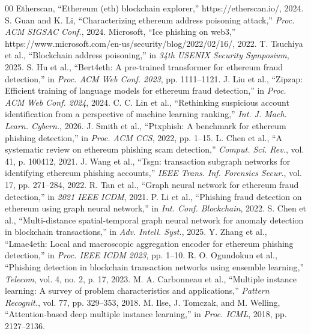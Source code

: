 \documentclass[conference]{IEEEtran}
\begin{document}
\begin{thebibliography}{00}
 Etherscan, ``Ethereum (eth) blockchain explorer,'' https://etherscan.io/, 2024.
 S. Guan and K. Li, ``Characterizing ethereum address poisoning attack,'' \emph{Proc. ACM SIGSAC Conf.}, 2024.
 Microsoft, ``Ice phishing on web3,'' https://www.microsoft.com/en-us/security/blog/2022/02/16/, 2022.
 T. Tsuchiya et al., ``Blockchain address poisoning,'' in \emph{34th USENIX Security Symposium}, 2025.
 S. Hu et al., ``Bert4eth: A pre-trained transformer for ethereum fraud detection,'' in \emph{Proc. ACM Web Conf. 2023}, pp. 1111--1121.
 J. Liu et al., ``Zipzap: Efficient training of language models for ethereum fraud detection,'' in \emph{Proc. ACM Web Conf. 2024}, 2024.
 C. C. Lin et al., ``Rethinking suspicious account identification from a perspective of machine learning ranking,'' \emph{Int. J. Mach. Learn. Cybern.}, 2026.
 J. Smith et al., ``Ptxphish: A benchmark for ethereum phishing detection,'' in \emph{Proc. ACM CCS}, 2022, pp. 1--15.
 L. Chen et al., ``A systematic review on ethereum phishing scam detection,'' \emph{Comput. Sci. Rev.}, vol. 41, p. 100412, 2021.
 J. Wang et al., ``Tsgn: transaction subgraph networks for identifying ethereum phishing accounts,'' \emph{IEEE Trans. Inf. Forensics Secur.}, vol. 17, pp. 271--284, 2022.
 R. Tan et al., ``Graph neural network for ethereum fraud detection,'' in \emph{2021 IEEE ICDM}, 2021.
 P. Li et al., ``Phishing fraud detection on ethereum using graph neural network,'' in \emph{Int. Conf. Blockchain}, 2022.
 S. Chen et al., ``Multi-distance spatial-temporal graph neural network for anomaly detection in blockchain transactions,'' in \emph{Adv. Intell. Syst.}, 2025.
 Y. Zhang et al., ``Lmae4eth: Local and macroscopic aggregation encoder for ethereum phishing detection,'' in \emph{Proc. IEEE ICDM 2023}, pp. 1--10.
 R. O. Ogundokun et al., ``Phishing detection in blockchain transaction networks using ensemble learning,'' \emph{Telecom}, vol. 4, no. 2, p. 17, 2023.
 M. A. Carbonneau et al., ``Multiple instance learning: A survey of problem characteristics and applications,'' \emph{Pattern Recognit.}, vol. 77, pp. 329--353, 2018.
 M. Ilse, J. Tomczak, and M. Welling, ``Attention-based deep multiple instance learning,'' in \emph{Proc. ICML}, 2018, pp. 2127--2136.

\end{thebibliography}
\end{document}
